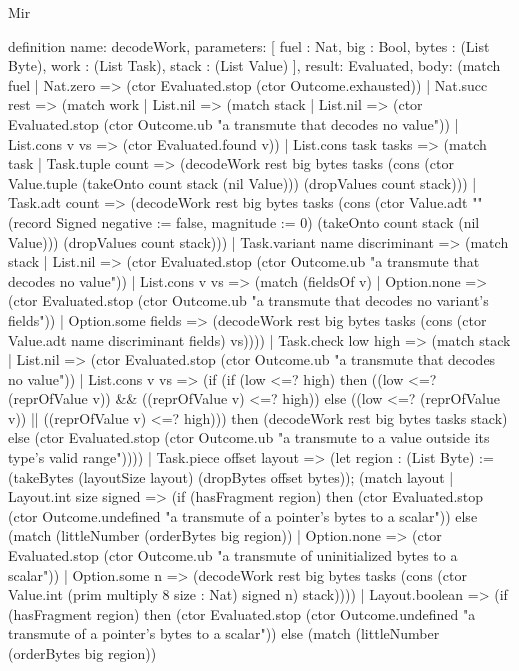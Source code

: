 \begin{lexlean}{Mir}
\begin{semanticmodule}
definition{
  name: decodeWork,
  parameters: [
    fuel : Nat,
    big : Bool,
    bytes : (List Byte),
    work : (List Task),
    stack : (List Value)
  ],
  result: Evaluated,
  body: (match fuel
    | Nat.zero => (ctor Evaluated.stop (ctor Outcome.exhausted))
    | Nat.succ rest => (match work
      | List.nil => (match stack
        | List.nil => (ctor Evaluated.stop (ctor Outcome.ub "a transmute that decodes no value"))
        | List.cons v vs => (ctor Evaluated.found v))
      | List.cons task tasks => (match task
        | Task.tuple count => (decodeWork rest big bytes tasks (cons (ctor Value.tuple (takeOnto count stack (nil Value))) (dropValues count stack)))
        | Task.adt count => (decodeWork rest big bytes tasks (cons (ctor Value.adt "" (record Signed {negative := false, magnitude := 0}) (takeOnto count stack (nil Value))) (dropValues count stack)))
        | Task.variant name discriminant => (match stack
          | List.nil => (ctor Evaluated.stop (ctor Outcome.ub "a transmute that decodes no value"))
          | List.cons v vs => (match (fieldsOf v)
            | Option.none => (ctor Evaluated.stop (ctor Outcome.ub "a transmute that decodes no variant's fields"))
            | Option.some fields => (decodeWork rest big bytes tasks (cons (ctor Value.adt name discriminant fields) vs))))
        | Task.check low high => (match stack
          | List.nil => (ctor Evaluated.stop (ctor Outcome.ub "a transmute that decodes no value"))
          | List.cons v vs => (if (if (low <=? high) then ((low <=? (reprOfValue v)) && ((reprOfValue v) <=? high)) else ((low <=? (reprOfValue v)) || ((reprOfValue v) <=? high))) then (decodeWork rest big bytes tasks stack) else (ctor Evaluated.stop (ctor Outcome.ub "a transmute to a value outside its type's valid range"))))
        | Task.piece offset layout => (let region : (List Byte) := (takeBytes (layoutSize layout) (dropBytes offset bytes)); (match layout
          | Layout.int size signed => (if (hasFragment region) then (ctor Evaluated.stop (ctor Outcome.undefined "a transmute of a pointer's bytes to a scalar")) else (match (littleNumber (orderBytes big region))
            | Option.none => (ctor Evaluated.stop (ctor Outcome.ub "a transmute of uninitialized bytes to a scalar"))
            | Option.some n => (decodeWork rest big bytes tasks (cons (ctor Value.int (prim multiply 8 size : Nat) signed n) stack))))
          | Layout.boolean => (if (hasFragment region) then (ctor Evaluated.stop (ctor Outcome.undefined "a transmute of a pointer's bytes to a scalar")) else (match (littleNumber (orderBytes big region))
}
\end{semanticmodule}
\end{lexlean}
